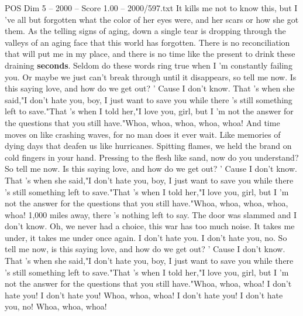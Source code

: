 \begin{textsample}{POS Dim 5 – 2000 – Score 1.00 – 2000/597.txt}  \label{ex:f5_pos_011}
It kills me not to know this, but I 've all but forgotten what the color of her eyes were, and her scars or how she got them.
As the telling signs of aging, down a single tear is dropping through the valleys of an aging face that this world has forgotten.
There is no reconciliation that will put me in my place, and there is no time like the present to drink these draining \textbf{seconds}.
Seldom do these words ring true when I 'm constantly failing you.
Or maybe we just can't break through until it disappears, so tell me now.
Is this saying love, and how do we get out? ' Cause I don't know.
That 's when she said,"I don't hate you, boy, I just want to save you while there 's still something left to save."That 's when I told her,"I love you, girl, but I 'm not the answer for the questions that you still have."Whoa, whoa, whoa, whoa, whoa!
And time moves on like crashing waves, for no man does it ever wait.
Like memories of dying days that deafen us like hurricanes.
Spitting flames, we held the brand on cold fingers in your hand.
Pressing to the flesh like sand, now do you understand?
So tell me now.
Is this saying love, and how do we get out? ' Cause I don't know.
That 's when she said,"I don't hate you, boy, I just want to save you while there 's still something left to save."That 's when I told her,"I love you, girl, but I 'm not the answer for the questions that you still have."Whoa, whoa, whoa, whoa, whoa! 1,000 miles away, there 's nothing left to say.
The door was slammed and I don't know.
Oh, we never had a choice, this war has too much noise.
It takes me under, it takes me under once again.
I don't hate you.
I don't hate you, no.
So tell me now, is this saying love, and how do we get out? ' Cause I don't know.
That 's when she said,"I don't hate you, boy, I just want to save you while there 's still something left to save."That 's when I told her,"I love you, girl, but I 'm not the answer for the questions that you still have."Whoa, whoa, whoa!
I don't hate you!
I don't hate you!
Whoa, whoa, whoa!
I don't hate you!
I don't hate you, no!
Whoa, whoa, whoa!

\end{textsample}
